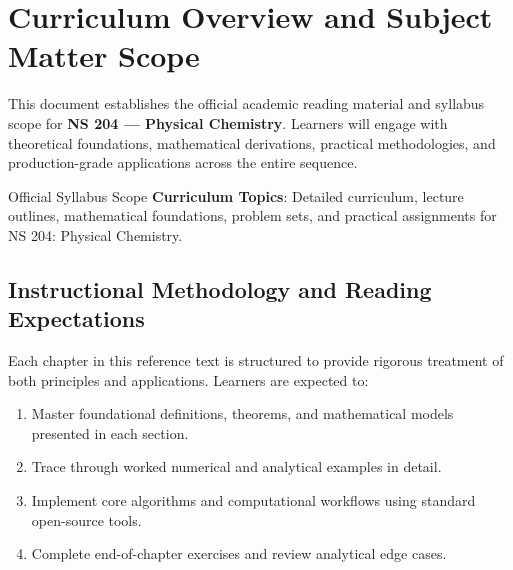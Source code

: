 \section{Curriculum Overview and Subject Matter Scope}

This document establishes the official academic reading material and syllabus scope for \textbf{NS 204 --- Physical Chemistry}. Learners will engage with theoretical foundations, mathematical derivations, practical methodologies, and production-grade applications across the entire sequence.

\begin{InsightBox}{Official Syllabus Scope}
  \textbf{Curriculum Topics}: Detailed curriculum, lecture outlines, mathematical foundations, problem sets, and practical assignments for NS 204: Physical Chemistry.
\end{InsightBox}

\subsection{Instructional Methodology and Reading Expectations}

Each chapter in this reference text is structured to provide rigorous treatment of both principles and applications. Learners are expected to:
\begin{enumerate}
  \item Master foundational definitions, theorems, and mathematical models presented in each section.
  \item Trace through worked numerical and analytical examples in detail.
  \item Implement core algorithms and computational workflows using standard open-source tools.
  \item Complete end-of-chapter exercises and review analytical edge cases.
\end{enumerate}

